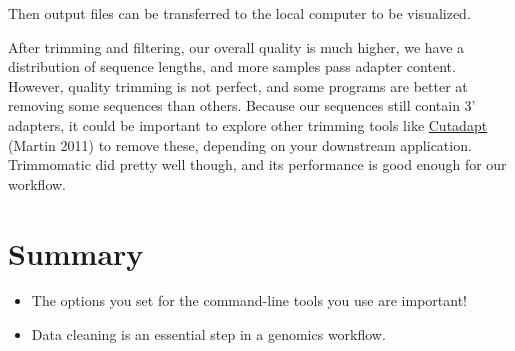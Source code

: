 \documentclass[
  letterpaper,
  DIV=11,
  numbers=noendperiod]{scrreprt}
\newenvironment{Shaded}{\begin{snugshade}}{\end{snugshade}}
\newcommand{\ExtensionTok}[1]{\textcolor[rgb]{0.00,0.23,0.31}{#1}}
\newcommand{\NormalTok}[1]{\textcolor[rgb]{0.00,0.23,0.31}{#1}}
\newcommand{\PreprocessorTok}[1]{\textcolor[rgb]{0.68,0.00,0.00}{#1}}
\providecommand{\tightlist}{%
  \setlength{\itemsep}{0pt}\setlength{\parskip}{0pt}}\usepackage{longtable,booktabs,array}
\begin{document}
\begin{tcolorbox}[enhanced jigsaw, toptitle=1mm, breakable, bottomrule=.15mm, colback=white, toprule=.15mm, opacityback=0, bottomtitle=1mm, coltitle=black, opacitybacktitle=0.6, rightrule=.15mm, colframe=quarto-callout-caution-color-frame, titlerule=0mm, colbacktitle=quarto-callout-caution-color!10!white, title={Solution}, left=2mm, leftrule=.75mm, arc=.35mm]

\begin{Shaded}
\end{Shaded}

Then output files can be transferred to the local computer to be
visualized.

After trimming and filtering, our overall quality is much higher, we
have a distribution of sequence lengths, and more samples pass adapter
content. However, quality trimming is not perfect, and some programs are
better at removing some sequences than others. Because our sequences
still contain 3' adapters, it could be important to explore other
trimming tools like
\href{http://cutadapt.readthedocs.io/en/stable/}{Cutadapt} (Martin 2011)
to remove these, depending on your downstream application. Trimmomatic
did pretty well though, and its performance is good enough for our
workflow.

\end{tcolorbox}

\hypertarget{summary-2}{%
\section{Summary}\label{summary-2}}

\begin{tcolorbox}[enhanced jigsaw, toptitle=1mm, breakable, bottomrule=.15mm, colback=white, toprule=.15mm, opacityback=0, bottomtitle=1mm, coltitle=black, opacitybacktitle=0.6, rightrule=.15mm, colframe=quarto-callout-important-color-frame, titlerule=0mm, colbacktitle=quarto-callout-important-color!10!white, title=\textcolor{quarto-callout-important-color}{\faExclamation}\hspace{0.5em}{Key points}, left=2mm, leftrule=.75mm, arc=.35mm]

\begin{itemize}
\tightlist
\item
  The options you set for the command-line tools you use are important!
\item
  Data cleaning is an essential step in a genomics workflow.
\end{itemize}

\end{tcolorbox}
\end{document}
